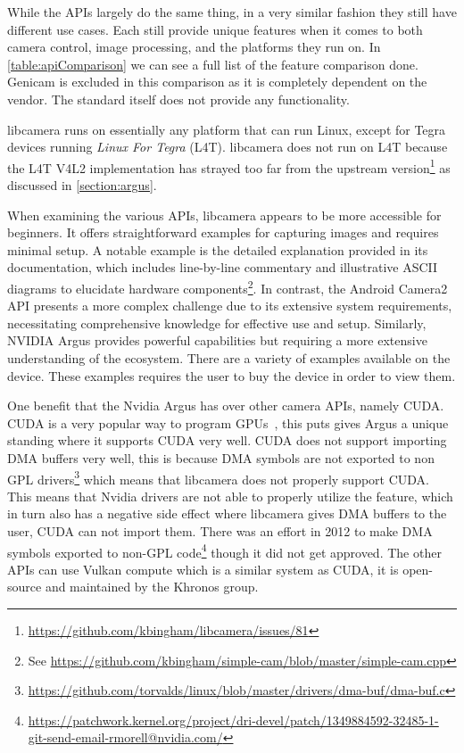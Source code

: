 While the APIs largely do the same thing, in a very similar fashion they still
have different use cases. Each still provide unique features when it comes to
both camera control, image processing, and the platforms they run on. In
\cref{table:apiComparison} we can see a full list of the feature comparison
done. Genicam is excluded in this comparison as it is completely dependent on
the vendor. The standard itself does not provide any functionality.

libcamera runs on essentially any platform that can run Linux, except for
Tegra devices running \textit{Linux For Tegra} (L4T). libcamera does not run
on L4T because the L4T V4L2 implementation has strayed too far from the
upstream version\footnote{\url{https://github.com/kbingham/libcamera/issues/81}} as
discussed in \cref{section:argus}.

When examining the various APIs, libcamera appears to be more accessible for
beginners. It offers straightforward examples for capturing images and requires
minimal setup. A notable example is the detailed explanation provided in its
documentation, which includes line-by-line commentary and illustrative ASCII
diagrams to elucidate hardware components\footnote{See \url{https://github.com/kbingham/simple-cam/blob/master/simple-cam.cpp}}.
In contrast, the Android Camera2 API presents a more complex challenge due to
its extensive system requirements, necessitating comprehensive knowledge for
effective use and setup. Similarly, NVIDIA Argus provides powerful capabilities but
requiring a more extensive understanding of the ecosystem. There are a variety
of examples available on the device. These examples requires the user to buy
the device in order to view them.

One benefit that the Nvidia Argus has over other camera APIs, namely CUDA.
CUDA is a very popular way to program GPUs~\cite{kalaiselvi2017survey}, this
puts gives Argus a unique standing where it supports CUDA very well. CUDA does
not support importing DMA buffers very well, this is because DMA symbols are
not exported to non GPL drivers\footnote{\url{https://github.com/torvalds/linux/blob/master/drivers/dma-buf/dma-buf.c}}
which means that libcamera does not properly support CUDA. This means that
Nvidia drivers are not able to properly utilize the feature, which in turn also
has a negative side effect where libcamera gives DMA buffers to the user, CUDA
can not import them. There was an effort in 2012 to make DMA symbols exported
to non-GPL code\footnote{\url{https://patchwork.kernel.org/project/dri-devel/patch/1349884592-32485-1-git-send-email-rmorell@nvidia.com/}} though it did not get approved. The other APIs can use Vulkan compute
which is a similar system as CUDA, it is open-source and maintained by the
Khronos group.

